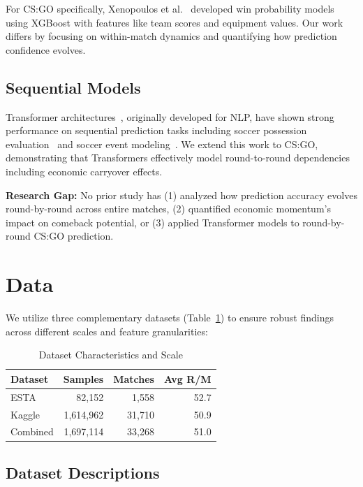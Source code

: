 \documentclass[10pt,twocolumn]{article}
\begin{document}
For CS:GO specifically, Xenopoulos et al.~\cite{xenopoulos2021} developed win probability models using XGBoost with features like team scores and equipment values. Our work differs by focusing on within-match dynamics and quantifying how prediction confidence evolves.

\subsection{Sequential Models}
Transformer architectures~\cite{vaswani2017}, originally developed for NLP, have shown strong performance on sequential prediction tasks including soccer possession evaluation~\cite{fernandez2021} and soccer event modeling~\cite{decroos2019}. We extend this work to CS:GO, demonstrating that Transformers effectively model round-to-round dependencies including economic carryover effects.

\textbf{Research Gap:} No prior study has (1) analyzed how prediction accuracy evolves round-by-round across entire matches, (2) quantified economic momentum's impact on comeback potential, or (3) applied Transformer models to round-by-round CS:GO prediction.

\section{Data}

We utilize three complementary datasets (Table~\ref{tab:datasets}) to ensure robust findings across different scales and feature granularities:

\begin{table}[h]
\centering
\caption{Dataset Characteristics and Scale}
\label{tab:datasets}
\scriptsize
\setlength{\tabcolsep}{3pt}
\begin{tabular}{lrrr}
\toprule
\textbf{Dataset} & \textbf{Samples} & \textbf{Matches} & \textbf{Avg R/M} \\
\midrule
ESTA & 82,152 & 1,558 & 52.7 \\
Kaggle & 1,614,962 & 31,710 & 50.9 \\
Combined & 1,697,114 & 33,268 & 51.0 \\
\bottomrule
\end{tabular}
\end{table}

\subsection{Dataset Descriptions}
\end{document}
